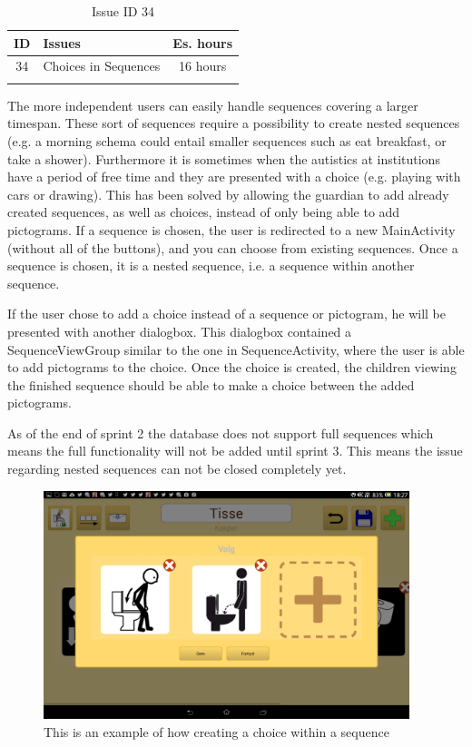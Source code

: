 \begin{longtable} { | c | p{12cm} | c | } 
\hline
	ID 	&	Issues	&		 Es. hours \\\hline
	34 	&	Choices in Sequences		&	16 hours \\\hline
\caption{Issue ID 34}
\label{tab:spr2_nested}
\end{longtable}

The more independent users can easily handle sequences covering a larger timespan. These sort of sequences require a possibility to create nested sequences (e.g. a morning schema could entail smaller sequences such as eat breakfast, or take a shower). Furthermore it is sometimes when the autistics at institutions have a period of free time and they are presented with a choice (e.g. playing with cars or drawing).
This has been solved by allowing the guardian to add already created sequences, as well as choices, instead of only being able to add pictograms. If a sequence is chosen, the user is redirected to a new MainActivity (without all of the buttons), and you can choose from existing sequences. Once a sequence is chosen, it is a nested sequence, i.e. a sequence within another sequence. 

If the user chose to add a choice instead of a sequence or pictogram, he will be presented with another dialogbox. This dialogbox contained a SequenceViewGroup similar to the one in SequenceActivity, where the user is able to add pictograms to the choice. Once the choice is created, the children viewing the finished sequence should be able to make a choice between the added pictograms.

As of the end of sprint 2 the database does not support full sequences which means the full functionality will not be added until sprint 3. This means the issue regarding nested sequences can not be closed completely yet.

\begin{figure} [h!]
\centering
\includegraphics[width=0.95\textwidth]{Pics/Sprint2/choices/choiceDialog.png}
\caption{This is an example of how creating a choice within a sequence}
\label{fig:Old_editName}
\end{figure}




